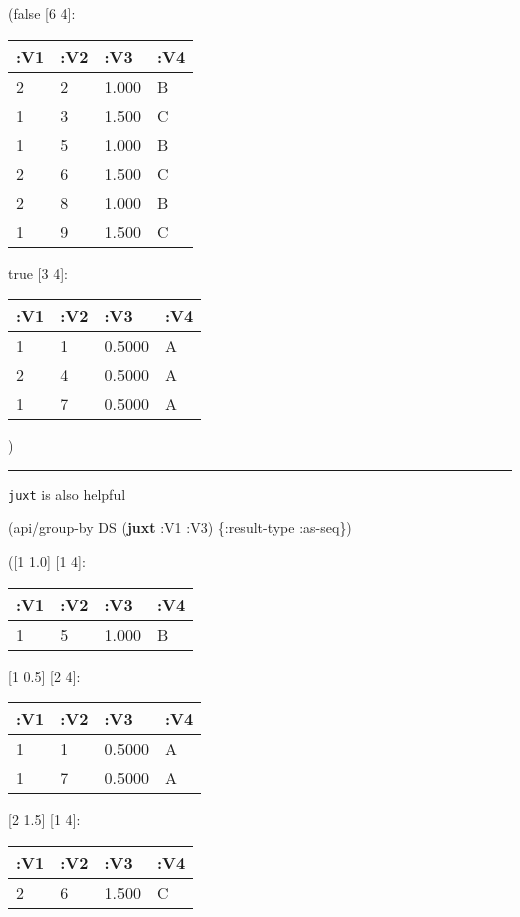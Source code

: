 \documentclass[]{article}
\newenvironment{Shaded}{\begin{snugshade}}{\end{snugshade}}
\newcommand{\KeywordTok}[1]{\textcolor[rgb]{0.13,0.29,0.53}{\textbf{#1}}}
\newcommand{\AttributeTok}[1]{\textcolor[rgb]{0.77,0.63,0.00}{#1}}
\newcommand{\NormalTok}[1]{#1}
\begin{document}
(false {[}6 4{]}:

\begin{longtable}[]{@{}llll@{}}
\toprule
:V1 & :V2 & :V3 & :V4\tabularnewline
\midrule
\endhead
2 & 2 & 1.000 & B\tabularnewline
1 & 3 & 1.500 & C\tabularnewline
1 & 5 & 1.000 & B\tabularnewline
2 & 6 & 1.500 & C\tabularnewline
2 & 8 & 1.000 & B\tabularnewline
1 & 9 & 1.500 & C\tabularnewline
\bottomrule
\end{longtable}

true {[}3 4{]}:

\begin{longtable}[]{@{}llll@{}}
\toprule
:V1 & :V2 & :V3 & :V4\tabularnewline
\midrule
\endhead
1 & 1 & 0.5000 & A\tabularnewline
2 & 4 & 0.5000 & A\tabularnewline
1 & 7 & 0.5000 & A\tabularnewline
\bottomrule
\end{longtable}

)

\begin{center}\rule{0.5\linewidth}{0.5pt}\end{center}

\texttt{juxt} is also helpful

\begin{Shaded}
\begin{Highlighting}[]
\NormalTok{(api/group-by DS (}\KeywordTok{juxt} \AttributeTok{:V1} \AttributeTok{:V3}\NormalTok{) \{}\AttributeTok{:result-type} \AttributeTok{:as-seq}\NormalTok{\})}
\end{Highlighting}
\end{Shaded}

({[}1 1.0{]} {[}1 4{]}:

\begin{longtable}[]{@{}llll@{}}
\toprule
:V1 & :V2 & :V3 & :V4\tabularnewline
\midrule
\endhead
1 & 5 & 1.000 & B\tabularnewline
\bottomrule
\end{longtable}

{[}1 0.5{]} {[}2 4{]}:

\begin{longtable}[]{@{}llll@{}}
\toprule
:V1 & :V2 & :V3 & :V4\tabularnewline
\midrule
\endhead
1 & 1 & 0.5000 & A\tabularnewline
1 & 7 & 0.5000 & A\tabularnewline
\bottomrule
\end{longtable}

{[}2 1.5{]} {[}1 4{]}:

\begin{longtable}[]{@{}llll@{}}
\toprule
:V1 & :V2 & :V3 & :V4\tabularnewline
\midrule
\endhead
2 & 6 & 1.500 & C\tabularnewline
\bottomrule
\end{longtable}
\end{document}
